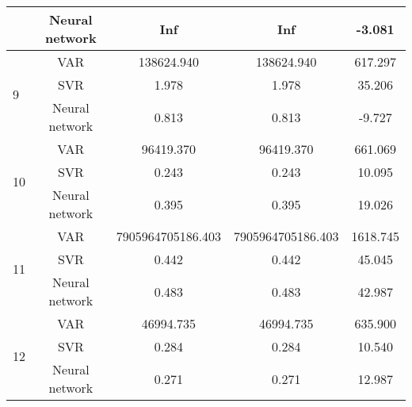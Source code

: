 \documentclass[12pt]{article}
\begin{document}
\begin{longtable}{|p{2cm}|c|c|c|c|}
\cline{2-5}
 &Neural network &   Inf &    Inf &    -3.081\\
\cline{2-5}
\hline
\multirow{3}{*}{9} &VAR &   138624.940 &    138624.940 &    617.297\\
\cline{2-5}
 &SVR &   1.978 &    1.978 &    35.206\\
\cline{2-5}
 &Neural network &   0.813 &    0.813 &    -9.727\\
\cline{2-5}
\hline
\multirow{3}{*}{10} &VAR &   96419.370 &    96419.370 &    661.069\\
\cline{2-5}
 &SVR &   0.243 &    0.243 &    10.095\\
\cline{2-5}
 &Neural network &   0.395 &    0.395 &    19.026\\
\cline{2-5}
\hline
\multirow{3}{*}{11} &VAR &   7905964705186.403 &    7905964705186.403 &    1618.745\\
\cline{2-5}
 &SVR &   0.442 &    0.442 &    45.045\\
\cline{2-5}
 &Neural network &   0.483 &    0.483 &    42.987\\
\cline{2-5}
\hline
\multirow{3}{*}{12} &VAR &   46994.735 &    46994.735 &    635.900\\
\cline{2-5}
 &SVR &   0.284 &    0.284 &    10.540\\
\cline{2-5}
 &Neural network &   0.271 &    0.271 &    12.987\\
\cline{2-5}
\hline

\end{longtable}
\end{document}
